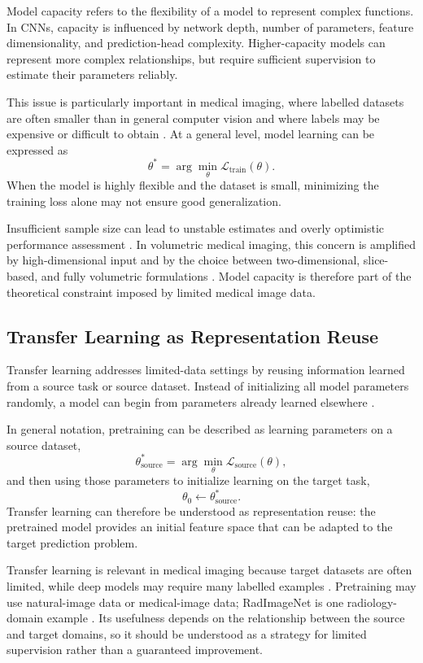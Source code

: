 Model capacity refers to the flexibility of a model to represent complex functions. In CNNs, capacity is influenced by network depth, number of parameters, feature dimensionality, and prediction-head complexity. Higher-capacity models can represent more complex relationships, but require sufficient supervision to estimate their parameters reliably.

This issue is particularly important in medical imaging, where labelled datasets are often smaller than in general computer vision and where labels may be expensive or difficult to obtain \cite{litjens2017survey}. At a general level, model learning can be expressed as
\[
\theta^{*} = \arg\min_{\theta} \mathcal{L}_{\mathrm{train}}(\theta).
\]
When the model is highly flexible and the dataset is small, minimizing the training loss alone may not ensure good generalization.

Insufficient sample size can lead to unstable estimates and overly optimistic performance assessment \cite{dhiman2023samplesize}. In volumetric medical imaging, this concern is amplified by high-dimensional input and by the choice between two-dimensional, slice-based, and fully volumetric formulations \cite{wang2023twoseventyfive}. Model capacity is therefore part of the theoretical constraint imposed by limited medical image data.


\subsection{Transfer Learning as Representation Reuse}
\label{sec:transfer_learning_representation_reuse}

Transfer learning addresses limited-data settings by reusing information learned from a source task or source dataset. Instead of initializing all model parameters randomly, a model can begin from parameters already learned elsewhere \cite{kim2022transfer}.

In general notation, pretraining can be described as learning parameters on a source dataset,
\[
\theta_{\mathrm{source}}^{*}
=
\arg\min_{\theta}
\mathcal{L}_{\mathrm{source}}(\theta),
\]
and then using those parameters to initialize learning on the target task,
\[
\theta_0 \leftarrow \theta_{\mathrm{source}}^{*}.
\]
Transfer learning can therefore be understood as representation reuse: the pretrained model provides an initial feature space that can be adapted to the target prediction problem.

Transfer learning is relevant in medical imaging because target datasets are often limited, while deep models may require many labelled examples \cite{litjens2017survey,kim2022transfer}. Pretraining may use natural-image data or medical-image data; RadImageNet is one radiology-domain example \cite{mei2022radimagenet}. Its usefulness depends on the relationship between the source and target domains, so it should be understood as a strategy for limited supervision rather than a guaranteed improvement.


